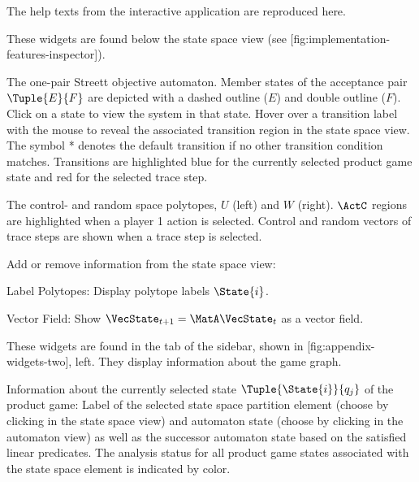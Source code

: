 The help texts from the interactive application are reproduced here.


\startsubject[title=View Widgets]

    These widgets are found below the state space view (see [fig:implementation-features-inspector]).

    \startsubsubject[title={Widget: Objective Automaton}]

        The one-pair Streett objective automaton.
        Member states of the acceptance pair $\Tuple{E}{F}$ are depicted with a dashed outline ($E$) and double outline ($F$).
        Click on a state to view the system in that state.
        Hover over a transition label with the mouse to reveal the associated transition region in the state space view.
        The symbol * denotes the default transition if no other transition condition matches.
        Transitions are highlighted blue for the currently selected product game state and red for the selected trace step.

    \stopsubsubject

    \startsubsubject[title={Widget: Control and Random Space}]

        The control- and random space polytopes, $U$ (left) and $W$ (right).
        $\ActC$ regions are highlighted when a player 1 action is selected.
        Control and random vectors of trace steps are shown when a trace step is selected.

    \stopsubsubject

    \startsubsubject[title={Widget: View Settings}]

        Add or remove information from the state space view:

        \startitemize[packed]
            \item{Label Polytopes: Display polytope labels $\State{i}$.}
            \item{Vector Field: Show $\VecState_{t+1} = \MatA \VecState_{t}$ as a vector field.}
        \stopitemize

    \stopsubsubject

\stopsubject


\startsubject[title={State Widgets}]

    These widgets are found in the  tab of the sidebar, shown in [fig:appendix-widgets-two], left.
    They display information about the game graph.

    \startsubsubject[title={Widget: Selection}]
        Information about the currently selected state $\Tuple{\State{i}}{q_j}$ of the product game:
        Label of the selected state space partition element (choose by clicking in the state space view) and automaton state (choose by clicking in the automaton view) as well as the successor automaton state based on the satisfied linear predicates.
        The analysis status for all product game states associated with the state space element is indicated by color.

